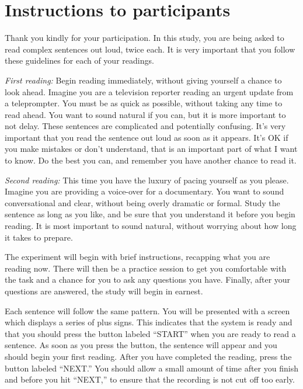 \documentclass[11pt,oneside]{book}
\begin{document}
\newpage

\hypertarget{instr}{%
\chapter{Instructions to participants}\label{instr}}

Thank you kindly for your participation. In this study, you are being asked to read complex sentences out loud, twice each. It is very important that you follow these guidelines for each of your readings.

\emph{First reading:} Begin reading immediately, without giving yourself a chance to look ahead. Imagine you are a television reporter reading an urgent update from a teleprompter. You must be as quick as possible, without taking any time to read ahead. You want to sound natural if you can, but it is more important to not delay. These sentences are complicated and potentially confusing. It's very important that you read the sentence out loud as soon as it appears. It's OK if you make mistakes or don't understand, that is an important part of what I want to know. Do the best you can, and remember you have another chance to read it.

\emph{Second reading:} This time you have the luxury of pacing yourself as you please. Imagine you are providing a voice-over for a documentary. You want to sound conversational and clear, without being overly dramatic or formal. Study the sentence as long as you like, and be sure that you understand it before you begin reading. It is most important to sound natural, without worrying about how long it takes to prepare.

The experiment will begin with brief instructions, recapping what you are reading now. There will then be a practice session to get you comfortable with the task and a chance for you to ask any questions you have. Finally, after your questions are answered, the study will begin in earnest.

Each sentence will follow the same pattern. You will be presented with a screen which displays a series of plus signs. This indicates that the system is ready and that you should press the button labeled ``START'' when you are ready to read a sentence. As soon as you press the button, the sentence will appear and you should begin your first reading. After you have completed the reading, press the button labeled ``NEXT.'' You should allow a small amount of time after you finish and before you hit ``NEXT,'' to ensure that the recording is not cut off too early.
\end{document}
